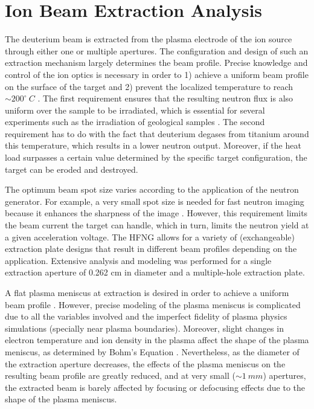 \documentclass[review]{elsarticle}
\begin{document}
\section{Ion Beam Extraction Analysis}

The deuterium beam is extracted from the plasma electrode of the ion source through either one or multiple apertures. The configuration and design of such an extraction mechanism largely determines the beam profile. Precise knowledge and control of the ion optics is necessary in order to 1) achieve a uniform beam profile on the surface of the target and 2) prevent the localized temperature to reach $\sim 200^{\circ}\ C$ \cite{AANG}. The first requirement ensures that the resulting neutron flux is also uniform over the sample to be irradiated, which is essential for several experiments such as the irradiation of geological samples \cite{geochron}. The second requirement has to do with the fact that deuterium degases from titanium around this temperature, which results in a lower neutron output. Moreover, if the heat load surpasses a certain value determined by the specific target configuration, the target can be eroded and destroyed. 

The optimum beam spot size varies according to the application of the neutron generator. For example, a very small spot size is needed for fast neutron imaging because it enhances the sharpness of the image \cite{adams}. However, this requirement limits the beam current the target can handle, which in turn, limits the neutron yield at a given acceleration voltage. The HFNG allows for a variety of (exchangeable) extraction plate designs that result in different beam profiles depending on the application. Extensive analysis and modeling was performed for a single extraction aperture of 0.262 cm in diameter and a multiple-hole extraction plate.

A flat plasma meniscus at extraction is desired in order to achieve a uniform beam profile \cite{CoryThesis}. However, precise modeling of the plasma meniscus is complicated due to all the variables involved and the imperfect fidelity of plasma physics simulations (specially near plasma boundaries). Moreover, slight changes in electron temperature and ion density in the plasma affect the shape of the plasma meniscus, as determined by Bohm's Equation \cite{plasma}. Nevertheless, as the diameter of the extraction aperture decreases, the effects of the plasma meniscus on the resulting beam profile are greatly reduced, and at very small ($\sim 1\ mm$) apertures, the extracted beam is barely affected by focusing or defocusing effects due to the shape of the plasma meniscus.   
\end{document}
